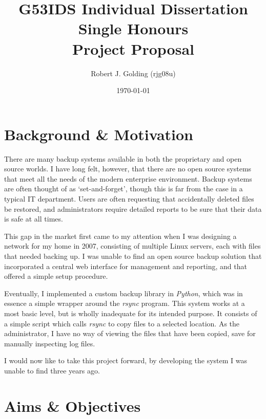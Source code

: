 \documentclass[a4paper]{article}
\title{
    \vspace{3cm}
    \huge{G53IDS Individual Dissertation Single Honours} \\[0.5cm]
    \LARGE{Project Proposal} \\[0.2cm]
}
\author{Robert J. Golding (rjg08u)} \date{\today}
\begin{document}
    \maketitle
    \vspace{10cm}
    \begin{figure}
        \centering
        \def\svgwidth{\columnwidth}
        
    \end{figure}
    \thispagestyle{empty}
    \newpage

    \section{Background \& Motivation}

    There are many backup systems available in both the proprietary and open
    source worlds. I have long felt, however, that there are no open source
    systems that meet all the needs of the modern enterprise environment.
    Backup systems are often thought of as `set-and-forget', though this is far
    from the case in a typical IT department. Users are often requesting that
    accidentally deleted files be restored, and administrators require detailed
    reports to be sure that their data is safe at all times.

    This gap in the market first came to my attention when I was designing
    a network for my home in 2007, consisting of multiple Linux servers, each
    with files that needed backing up. I was unable to find an open source
    backup solution that incorporated a central web interface for management
    and reporting, and that offered a simple setup procedure.

    Eventually, I implemented a custom backup library in \emph{Python}, which
    was in essence a simple wrapper around the \emph{rsync} program. This
    system works at a most basic level, but is wholly inadequate for its
    intended purpose. It consists of a simple script which calls \emph{rsync}
    to copy files to a selected location. As the administrator, I have no way
    of viewing the files that have been copied, save for manually inspecting
    log files.

    I would now like to take this project forward, by developing the system
    I was unable to find three years ago.

    \section{Aims \& Objectives}
\end{document}
